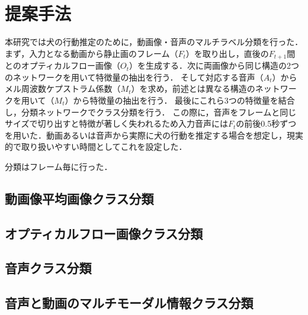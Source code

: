 \chapter{提案手法}
本研究では犬の行動推定のために，動画像・音声のマルチラベル分類を行った．
まず，入力となる動画から静止画のフレーム（$F_t$）を取り出し，直後の$F_{t+1}$間とのオプティカルフロー画像（$O_t$）を生成する．次に両画像から同じ構造の2つのネットワークを用いて特徴量の抽出を行う．
そして対応する音声（$A_t$）からメル周波数ケプストラム係数（$M_t$）を求め，前述とは異なる構造のネットワークを用いて（$M_t$）から特徴量の抽出を行う．
最後にこれら3つの特徴量を結合し，分類ネットワークでクラス分類を行う．
この際に，音声をフレームと同じサイズで切り出すと特徴が著しく失われるため入力音声には$F_t$の前後0.5秒ずつを用いた．動画あるいは音声から実際に犬の行動を推定する場合を想定し，現実的で取り扱いやすい時間としてこれを設定した．

分類はフレーム毎に行った．
\section{動画像平均画像クラス分類}
\section{オプティカルフロー画像クラス分類}
\section{音声クラス分類}
\section{音声と動画のマルチモーダル情報クラス分類}

